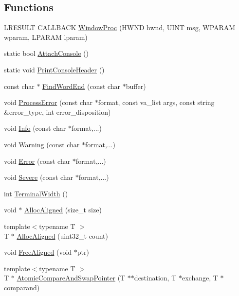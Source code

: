 \subsection*{Functions}
\begin{DoxyCompactItemize}
\item 
L\+R\+E\+S\+U\+LT C\+A\+L\+L\+B\+A\+CK \hyperlink{namespacemage_a327147b1d76dcb41c17c23f9603d80c1}{Window\+Proc} (H\+W\+ND hwnd, U\+I\+NT msg, W\+P\+A\+R\+AM wparam, L\+P\+A\+R\+AM lparam)
\item 
static bool \hyperlink{namespacemage_a720768843a1d752ebf061e1475fa004f}{Attach\+Console} ()
\item 
static void \hyperlink{namespacemage_afb64e5bf4755b0a56a7b0d086bc5f4be}{Print\+Console\+Header} ()
\item 
const char $\ast$ \hyperlink{namespacemage_ab2e62d950dc620167f4128cb16033998}{Find\+Word\+End} (const char $\ast$buffer)
\item 
void \hyperlink{namespacemage_a958c4a88b6cd58f950e1c9b9e46f6906}{Process\+Error} (const char $\ast$format, const va\+\_\+list args, const string \&error\+\_\+type, int error\+\_\+disposition)
\item 
void \hyperlink{namespacemage_add6aa5f13960ce07b20f48d273956a91}{Info} (const char $\ast$format,...)
\item 
void \hyperlink{namespacemage_a0eccd8065c75d5f2bf86b48a5be3bfe5}{Warning} (const char $\ast$format,...)
\item 
void \hyperlink{namespacemage_a52a7fe8c9ce39afd9e0b0299373db0fa}{Error} (const char $\ast$format,...)
\item 
void \hyperlink{namespacemage_a95c8b0820c579bbde59062fd9d05e4f4}{Severe} (const char $\ast$format,...)
\item 
int \hyperlink{namespacemage_a0c12a51bf3468b372932ffc1138a4ddc}{Terminal\+Width} ()
\item 
void $\ast$ \hyperlink{namespacemage_a7d706913bb9fb322c938cd3e4d8eaede}{Alloc\+Aligned} (size\+\_\+t size)
\item 
{\footnotesize template$<$typename T $>$ }\\T $\ast$ \hyperlink{namespacemage_ae2f31ba64620694aa0dfc8ca6e5d5941}{Alloc\+Aligned} (uint32\+\_\+t count)
\item 
void \hyperlink{namespacemage_a401c54df21447c491c527735647b5f80}{Free\+Aligned} (void $\ast$ptr)
\item 
{\footnotesize template$<$typename T $>$ }\\T $\ast$ \hyperlink{namespacemage_aed89242e67231f3ddef77bdc63b32b6c}{Atomic\+Compare\+And\+Swap\+Pointer} (T $\ast$$\ast$destination, T $\ast$exchange, T $\ast$comparand)
$$
\end{DoxyCompactItemize}
